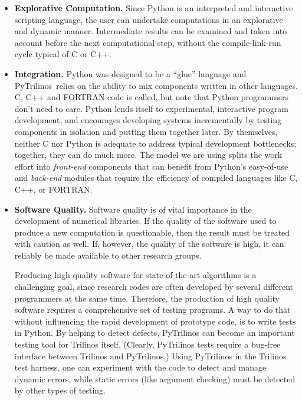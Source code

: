 \documentclass[acmtocl]{acmtrans2m}
\newcommand{\PyTrilinos}{{PyTrilinos}}
\begin{document}
\begin{itemize}
\item {\bf Explorative Computation.} Since Python is an interpreted
  and interactive scripting language, the user can undertake
  computations in an explorative and dynamic manner. Intermediate
  results can be examined and taken into account before the next
  computational step, without the compile-link-run cycle typical of C
  or C++.

\item {\bf Integration.} Python was designed to be a ``glue'' language
  and \PyTrilinos\ relies on the ability to mix components written in
  other languages. C, C++ and FORTRAN code is called, but note that
  Python programmers don't need to care.  Python lends itself to
  experimental, interactive program development, and encourages
  developing systems incrementally by testing components in isolation
  and putting them together later.  By themselves, neither C nor
  Python is adequate to address typical development bottlenecks;
  together, they can do much more.  The model we are using splits the
  work effort into {\sl front-end} components that can benefit from
  Python's easy-of-use and {\sl back-end} modules that require the
  efficiency of compiled languages like C, C++, or FORTRAN.

\item {\bf Software Quality.} Software quality is of vital importance
  in the development of numerical libraries. If the quality of the
  software used to produce a new computation is questionable, then the
  result must be treated with caution as well. If, however, the
  quality of the software is high, it can reliably be made available
  to other research groups.

  Producing high quality software for state-of-the-art algorithms is a
  challenging goal, since research codes are often developed by
  several different programmers at the same time. Therefore, the
  production of high quality software requires a comprehensive set of
  testing programs. A way to do that without influencing the rapid
  development of prototype code, is to write tests in Python. By
  helping to detect defects, PyTrilinos can become an important
  testing tool for Trilinos itself. (Clearly, PyTrilinos tests require
  a bug-free interface between Trilinos and PyTrilinos.) Using
  PyTrilinos in the Trilinos test harness, one can experiment with the
  code to detect and manage dynamic errors, while static errors (like
  argument checking) must be detected by other types of testing.


\end{itemize}
\end{document}
